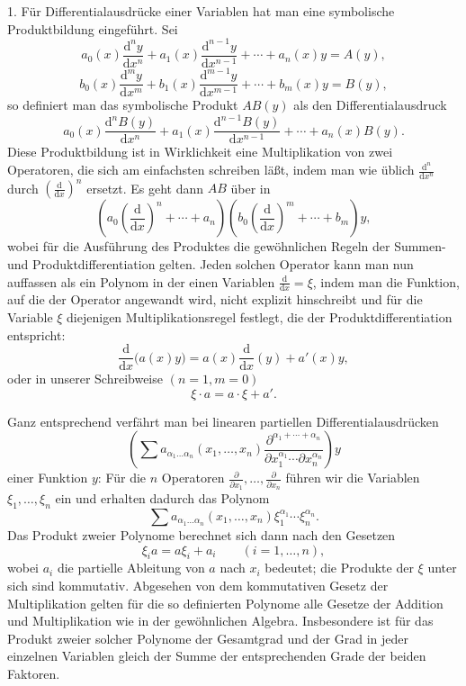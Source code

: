 \documentclass[11pt]{article}
\providecommand{\dd}{\mathrm d}
\providecommand{\p}{\partial}
\providecommand{\p}{\partial}
\providecommand{\dd}{\mathrm d}
\begin{document}
1. Für Differentialausdrücke einer Variablen hat man eine symbolische Produktbildung eingeführt. Sei
\[
 a_0(x)\frac{\dd^n y}{\dd x^n}+a_1(x)\frac{\dd^{n-1}y}{\dd x^{n-1}}+\cdots+a_n(x)y=A(y),
\]
\[
 b_0(x)\frac{\dd^m y}{\dd x^m}+b_1(x)\frac{\dd^{m-1}y}{\dd x^{m-1}}+\cdots+b_m(x)y=B(y),
\]
so definiert man das symbolische Produkt $AB(y)$ als den Differentialausdruck
\[
 a_0(x)\frac{\dd^n B(y)}{\dd x^n}+a_1(x)\frac{\dd^{n-1}B(y)}{\dd x^{n-1}}+\cdots+a_n(x)B(y).
\]
Diese Produktbildung ist in Wirklichkeit eine Multiplikation von zwei Operatoren, die sich am einfachsten schreiben läßt, indem man wie üblich $\frac{\dd^n}{\dd x^n}$ durch $\left(\frac{\dd}{\dd x}\right)^n$ ersetzt. Es geht dann $AB$ über in
\[
 \left(a_0\left(\frac{\dd}{\dd x}\right)^n+\cdots+a_n\right)
 \left(b_0\left(\frac{\dd}{\dd x}\right)^m+\cdots+b_m\right)y,
\]
wobei für die Ausführung des Produktes die gewöhnlichen Regeln der Summen- und Produktdifferentiation gelten. Jeden solchen Operator kann man nun auffassen als ein Polynom in der einen Variablen $\frac{\dd}{\dd x}=\xi$, indem man die Funktion, auf die der Operator angewandt wird, nicht explizit hinschreibt und für die Variable $\xi$ diejenigen Multiplikationsregel festlegt, die der Produktdifferentiation entspricht:
\[
 \frac{\dd}{\dd x}\bigl(a(x)y\bigr)=a(x)\frac{\dd}{\dd x}(y)+a'(x)y,
\]
oder in unserer Schreibweise $(n=1, m=0)$
\begin{equation}
 \xi\cdot a=a\cdot\xi+a'.
\tag{1}
\end{equation}

Ganz entsprechend verfährt man bei linearen partiellen Differentialausdrücken
\[
 \left(\sum a_{\alpha_1\ldots\alpha_n}(x_1,\ldots,x_n)
 \frac{\p^{\alpha_1+\cdots+\alpha_n}}
 {\p x_1^{\alpha_1}\cdots\p x_n^{\alpha_n}}\right)y
\]
einer Funktion $y$: Für die $n$ Operatoren $\frac{\p}{\p x_1},\ldots,\frac{\p}{\p x_n}$ führen wir die Variablen $\xi_1,\ldots,\xi_n$ ein und erhalten dadurch das Polynom
\[
 \sum a_{\alpha_1\ldots\alpha_n}(x_1,\ldots,x_n)
 \xi_1^{\alpha_1}\cdots\xi_n^{\alpha_n}.
\]
Das Produkt zweier Polynome berechnet sich dann nach den Gesetzen
\begin{equation}
 \xi_i a=a\xi_i+a_i \qquad (i=1,\ldots,n),
\tag{2}
\end{equation}
wobei $a_i$ die partielle Ableitung von $a$ nach $x_i$ bedeutet; die Produkte der $\xi$ unter sich sind kommutativ. Abgesehen von dem kommutativen Gesetz der Multiplikation gelten für die so definierten Polynome alle Gesetze der Addition und Multiplikation wie in der gewöhnlichen Algebra. Insbesondere ist für das Produkt zweier solcher Polynome der Gesamtgrad und der Grad in jeder einzelnen Variablen gleich der Summe der entsprechenden Grade der beiden Faktoren.
\end{document}
